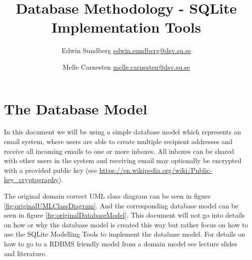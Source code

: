 \documentclass[a4paper,11pt,oneside]{article}
\title{Database Methodology - SQLite Implementation Tools}
\author{Edwin Sundberg \url{edwin.sundberg@dsv.su.se} \and Melle Carnesten \url{melle.carnesten@dsv.su.se}}
\begin{document}
\maketitle \pagebreak

\begin{sloppypar}  

\tableofcontents \pagebreak




\section{The Database Model}
\label{exampleDatabaseModel}
In this document we will be using a simple database model which represents an email system, where users are able to create multiple recipient addresses and receive all incoming emails to one or more inboxes. All inboxes can be shared with other users in the system and receiving email may optionally be encrypted with a provided public key (see \url{https://en.wikipedia.org/wiki/Public-key_cryptography}). 

The original domain correct UML class diagram can be seen in figure \autoref{fig:originalUMLClassDiagram}. And the corresponding database model can be seen in figure \autoref{fig:originalDatabaseModel}. This document will not go into details on how or why the database model is created this way but rather focus on how to use the SQLite Modelling Tools to implement the database model. For details on how to go to a RDBMS friendly model from a domain model see lecture slides and literature.


\end{sloppypar}
\end{document}
